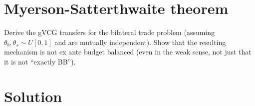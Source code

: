 \documentclass[a4paper]{article}
\newif\ifsolutions
\begin{document}
%
%	
\fi



\section{Myerson-Satterthwaite theorem}

	Derive the gVCG transfers for the bilateral trade problem (assuming $\theta_b,\theta_s \sim U[0,1]$ and are mutually independent). Show that the resulting mechanism is not ex ante budget balanced (even in the weak sense, not just that it is not ``exactly BB'').

\ifsolutions
\section*{Solution}
\end{document}
